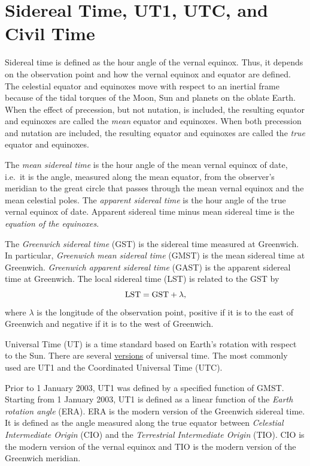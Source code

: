 \documentclass[12pt]{article}
\newcommand \beq {\begin{equation}}
\newcommand \eeq {\end{equation}}
\begin{document}
\section{Sidereal Time, UT1, UTC, and Civil Time}

Sidereal time is defined as the hour angle of the vernal equinox. Thus, it 
depends on the observation point and how the vernal equinox and equator are defined. 
The celestial equator and equinoxes move with respect 
to an inertial frame because of the tidal torques of the Moon, Sun and planets on 
the oblate Earth. When the 
effect of precession, but not nutation, is included, the resulting equator and equinoxes 
are called the {\em mean} equator and equinoxes. When both precession and nutation are 
included, the resulting equator and equinoxes are called the {\em true} equator and equinoxes. 

The {\em mean sidereal time} is the hour angle of the mean vernal equinox of date, i.e.\ 
it is the angle, measured along the mean equator, from the observer's meridian to 
the great circle that passes through the mean vernal equinox and the mean celestial poles. 
The {\em apparent sidereal time} is the hour angle of the true vernal equinox of date. 
Apparent sidereal time minus mean sidereal time is the {\em equation of the equinoxes}.

The {\em Greenwich sidereal time} (GST) is the sidereal time measured at Greenwich. 
In particular, {\em Greenwich mean sidereal time} (GMST) is the mean sidereal time 
at Greenwich. {\em Greenwich apparent sidereal time} (GAST) is the apparent sidereal time 
at Greenwich. The local sidereal time (LST) is related to the GST by 
\beq
  {\rm LST = GST} + \lambda ,
\label{eq:LST}
\eeq
where $\lambda$ is the longitude of the observation point, positive if it is to the 
east of Greenwich and negative if it is to the west of Greenwich.

Universal Time (UT) is a time standard based on Earth's rotation with respect to the Sun. 
There are 
several \href{https://en.wikipedia.org/wiki/Universal_Time#Versions}{versions} of 
universal time. The most commonly used are UT1 and the Coordinated 
Universal Time (UTC). 

Prior to 1 January 2003, UT1 was defined by a specified function of GMST. Starting 
from 1 January 2003, UT1 is defined as a linear function of the {\em Earth rotation 
angle} (ERA). ERA is the modern version of the Greenwich sidereal time. It is defined as 
the angle measured along the true equator 
between {\em Celestial Intermediate Origin} (CIO) and the 
{\em Terrestrial Intermediate Origin} (TIO). CIO is the modern version of the vernal 
equinox and TIO is the modern version of the Greenwich meridian.
\end{document}
